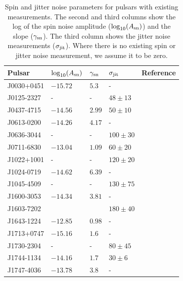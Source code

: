 \begin{table}
\caption{\label{tab:redNoiseJitterNoise}
Spin and jitter noise parameters for pulsars with existing measurements. 
The second and third columns show the log of the spin noise amplitude ($\log_{10}(A_{\rm sn})$) and the slope ($\gamma_{\rm sn}$). 
The third column shows the jitter noise measurements ($\sigma_{\rm jit}$). 
Where there is no existing spin or jitter noise measurement, we assume it to be zero. 
}
\begin{center}
\begin{tabular}{lllll}
\hline\hline
Pulsar     & $\log_{10}(A_{\rm sn})$  & $\gamma_{\rm sn}$ & $\sigma_{\rm jit}$ &  Reference \\
\hline
J0030+0451 & $-15.72$ & $5.3$  & -              & ~\cite{NANOGrav12p5yr:2021}\\
J0125-2327 & -        & -      & $48  \pm 13$   & ~\cite{ParthasarathyEtAl:2021}\\ 
J0437-4715 & $-14.56$ & $2.99$ & $50  \pm 10$   & ~\cite{GoncharovEtAl:2021,ParthasarathyEtAl:2021}\\
J0613-0200 & $-14.26$ & $4.17$ & -              & ~\cite{GoncharovEtAl:2021}\\
J0636-3044 & -        & -      & $100 \pm 30$   & ~\cite{ParthasarathyEtAl:2021}\\
J0711-6830 & $-13.04$ & $1.09$ &  $60 \pm 20$   & ~\cite{GoncharovEtAl:2021,ParthasarathyEtAl:2021}\\ 
J1022+1001 & -        & -      & $120 \pm 20$   & ~\cite{ParthasarathyEtAl:2021}\\
J1024-0719 & $-14.62$ & $6.39$ & -              & ~\cite{GoncharovEtAl:2021}\\
J1045-4509 & -        & -      & $130 \pm 75$   & ~\cite{ParthasarathyEtAl:2021}\\
J1600-3053 & $-14.34$ & $3.81$ & -              & ~\cite{GoncharovEtAl:2021}\\
J1603-7202 &          &        & $180 \pm 40$   & ~\cite{ParthasarathyEtAl:2021}\\
J1643-1224 & $-12.85$ & $0.98$ & -              & ~\cite{GoncharovEtAl:2021}\\
J1713+0747 & $-15.16$ & $1.6$  & -              & ~\cite{NANOGrav12p5yr:2021}\\
J1730-2304 & -        & -      & $80  \pm 45$   & ~\cite{ParthasarathyEtAl:2021}\\
J1744-1134 & $-14.16$ & $1.7$  & $30  \pm  6$   & ~\cite{NANOGrav12p5yr:2021,ParthasarathyEtAl:2021}\\  
J1747-4036 & $-13.78$ & $3.8$  & -              & ~\cite{NANOGrav12p5yr:2021}\\

\end{tabular}
\end{center}
\end{table}
